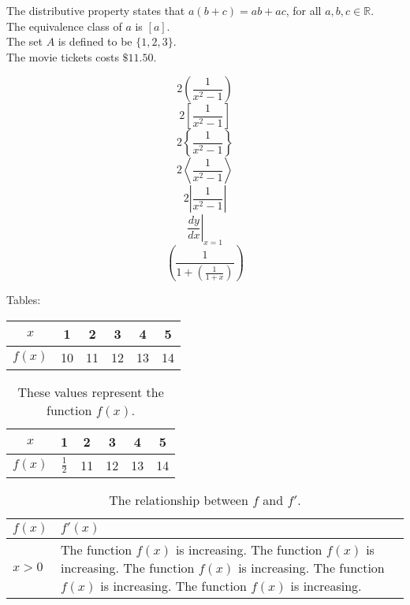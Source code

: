 \documentclass[11pt]{article}
\begin{document}
The distributive property states that $a(b+c)=ab+ac$, for all $a, b, c \in \mathbb{R}$. \\[6pt]
The equivalence class of $a$ is $[a]$. \\[6pt]
The set $A$ is defined to be $\{1, 2, 3\}$. \\[6 pt] %
The movie tickets costs $\$11.50$. %

$$2\left(\frac{1}{x^2-1}\right)$$ %
$$2\left[\frac{1}{x^2-1}\right]$$
$$2\left\{\frac{1}{x^2-1}\right\}$$ %
$$2\left \langle \frac{1}{x^2-1}\right \rangle$$ %
$$2\left | \frac{1}{x^2-1}\right | $$ 
$$\left.\frac{dy}{dx}\right|_{x=1}$$ %
$$\left(\frac{1}{1+\left(\frac{1}{1+x}\right)}\right)$$

Tables:\\

\begin{tabular}{|c||c|c|c|c|c|} %
\hline
$x$ & 1 & 2 & 3 & 4 & 5 \\ \hline
$f(x)$ & 10 & 11 & 12 & 13 & 14 \\ \hline
\end{tabular}

\vspace{1cm}

\begin{table}[H]
\centering
\def\arraystretch{1.5}
\begin{tabular}{|c||c|c|c|c|c|}
\hline
$x$ & 1 & 2 & 3 & 4 & 5 \\ \hline
$f(x)$ & $\frac{1}{2}$ & 11 & 12 & 13 & 14 \\ \hline
\end{tabular}
\caption{These values represent the function $f(x)$.}
\end{table}


\begin{table}[H]
\centering
\caption{The relationship between $f$ and $f'$.}
\def\arraystretch{1.5}
\begin{tabular}{|l|p{3in}|}
\hline
$f(x)$ & $f'(x)$ \\ \hline
$x>0$ & The function $f(x)$ is increasing. The 
function $f(x)$ is increasing. The function $f(x)$ is 
increasing. The function $f(x)$ is increasing. The 
function $f(x)$ is increasing. \\ \hline
\end{tabular}
\end{table}
\end{document}
